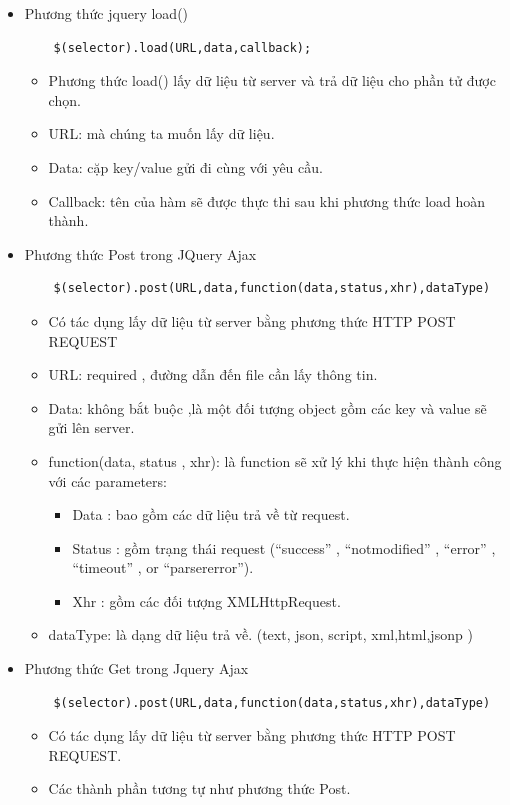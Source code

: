 \begin{itemize}
\item  Phương thức jquery load()
\begin{lstlisting}
	$(selector).load(URL,data,callback);
\end{lstlisting}
\begin{itemize}
\item Phương thức load() lấy dữ liệu từ server và trả dữ liệu cho phần tử được chọn.
\item URL: mà chúng ta muốn lấy dữ liệu.
\item Data: cặp key/value gửi đi cùng với yêu cầu.
\item Callback: tên của hàm sẽ được thực thi sau khi phương thức load hoàn thành.
\end{itemize}
\item Phương thức Post trong JQuery Ajax
\begin{lstlisting}
	$(selector).post(URL,data,function(data,status,xhr),dataType)	
\end{lstlisting}
\begin{itemize}
	\item Có tác dụng lấy dữ liệu từ server bằng phương thức HTTP POST REQUEST
	\item URL: required , đường dẫn đến file cần lấy thông tin.
	\item Data: không bắt buộc ,là một đối tượng object gồm các key và value sẽ gửi lên server.
	\item function(data, status , xhr): là function sẽ xử lý khi thực hiện thành công với các parameters:
	\begin{itemize}
		\item  Data : bao gồm các dữ liệu trả về từ request.
		\item  Status : gồm trạng thái request (“success” , “notmodified” , “error” , “timeout” , or “parsererror”).
		\item  Xhr : gồm các đối tượng XMLHttpRequest.
	\end{itemize}
	\item  dataType: là dạng dữ liệu trả về. (text, json, script, xml,html,jsonp )
\end{itemize}
\item Phương thức Get trong Jquery Ajax
\begin{lstlisting}
	$(selector).post(URL,data,function(data,status,xhr),dataType)
\end{lstlisting}	
\begin{itemize}
	\item Có tác dụng lấy dữ liệu từ server bằng phương thức HTTP POST REQUEST.
	\item Các thành phần tương tự như phương thức Post.
\end{itemize}
\end{itemize}
